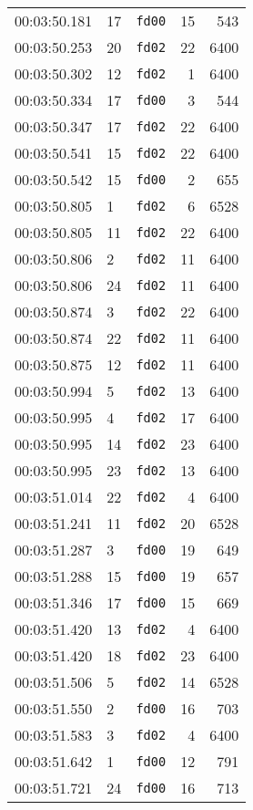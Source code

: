 \documentclass{article}
\begin{document}
\begin{longtable}{lllrr}
00:03:50.181 & 17 & \texttt{fd00} & 15 & 543 \\
00:03:50.253 & 20 & \texttt{fd02} & 22 & 6400 \\
00:03:50.302 & 12 & \texttt{fd02} & 1 & 6400 \\
00:03:50.334 & 17 & \texttt{fd00} & 3 & 544 \\
00:03:50.347 & 17 & \texttt{fd02} & 22 & 6400 \\
00:03:50.541 & 15 & \texttt{fd02} & 22 & 6400 \\
00:03:50.542 & 15 & \texttt{fd00} & 2 & 655 \\
00:03:50.805 & 1 & \texttt{fd02} & 6 & 6528 \\
00:03:50.805 & 11 & \texttt{fd02} & 22 & 6400 \\
00:03:50.806 & 2 & \texttt{fd02} & 11 & 6400 \\
00:03:50.806 & 24 & \texttt{fd02} & 11 & 6400 \\
00:03:50.874 & 3 & \texttt{fd02} & 22 & 6400 \\
00:03:50.874 & 22 & \texttt{fd02} & 11 & 6400 \\
00:03:50.875 & 12 & \texttt{fd02} & 11 & 6400 \\
00:03:50.994 & 5 & \texttt{fd02} & 13 & 6400 \\
00:03:50.995 & 4 & \texttt{fd02} & 17 & 6400 \\
00:03:50.995 & 14 & \texttt{fd02} & 23 & 6400 \\
00:03:50.995 & 23 & \texttt{fd02} & 13 & 6400 \\
00:03:51.014 & 22 & \texttt{fd02} & 4 & 6400 \\
00:03:51.241 & 11 & \texttt{fd02} & 20 & 6528 \\
00:03:51.287 & 3 & \texttt{fd00} & 19 & 649 \\
00:03:51.288 & 15 & \texttt{fd00} & 19 & 657 \\
00:03:51.346 & 17 & \texttt{fd00} & 15 & 669 \\
00:03:51.420 & 13 & \texttt{fd02} & 4 & 6400 \\
00:03:51.420 & 18 & \texttt{fd02} & 23 & 6400 \\
00:03:51.506 & 5 & \texttt{fd02} & 14 & 6528 \\
00:03:51.550 & 2 & \texttt{fd00} & 16 & 703 \\
00:03:51.583 & 3 & \texttt{fd02} & 4 & 6400 \\
00:03:51.642 & 1 & \texttt{fd00} & 12 & 791 \\
00:03:51.721 & 24 & \texttt{fd00} & 16 & 713 \\

\end{longtable}
\end{document}
